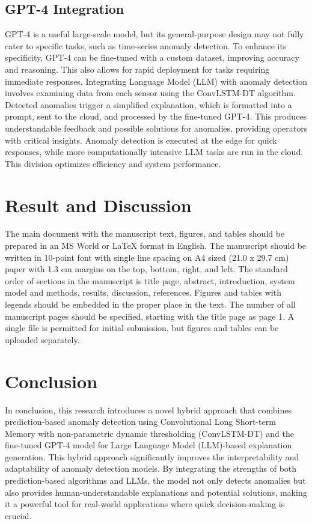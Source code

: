 \documentclass[final,3p,times,twocolumn]{elsarticle}
\begin{document}
\subsection{GPT-4 Integration}
GPT-4 is a useful large-scale model, but its general-purpose design may not fully cater to specific tasks, such as time-series anomaly detection. To enhance its specificity, GPT-4 can be fine-tuned with a custom dataset, improving accuracy and reasoning. This also allows for rapid deployment for tasks requiring immediate responses. Integrating Language Model (LLM) with anomaly detection involves examining data from each sensor using the ConvLSTM-DT algorithm. Detected anomalies trigger a simplified explanation, which is formatted into a prompt, sent to the cloud, and processed by the fine-tuned GPT-4. This produces understandable feedback and possible solutions for anomalies, providing operators with critical insights. Anomaly detection is executed at the edge for quick responses, while more computationally intensive LLM tasks are run in the cloud. This division optimizes efficiency and system performance.

\section{Result and Discussion}\label{sec3}

The main document with the manuscript text, figures, and tables should be prepared in an MS World or LaTeX format in English. 
The manuscript should be written in 10-point font with single line spacing on A4 sized (21.0 x 29.7 cm) paper with 1.3 cm margins on the top, bottom, right, and left. 
The standard order of sections in the manuscript is title page, abstract, introduction, system model and methods, results, discussion, references. 
Figures and tables with legends should be embedded in the proper place in the text. 
The number of all manuscript pages should be specified, starting with the title page as page 1. A single file is permitted for initial submission, but figures and tables can be uploaded separately.

\section{Conclusion}\label{sec4}
In conclusion, this research introduces a novel hybrid approach that combines prediction-based anomaly detection using Convolutional Long Short-term Memory with non-parametric dynamic thresholding (ConvLSTM-DT) and the fine-tuned GPT-4 model for Large Language Model (LLM)-based explanation generation. This hybrid approach significantly improves the interpretability and adaptability of anomaly detection models. By integrating the strengths of both prediction-based algorithms and LLMs, the model not only detects anomalies but also provides human-understandable explanations and potential solutions, making it a powerful tool for real-world applications where quick decision-making is crucial.
\end{document}
